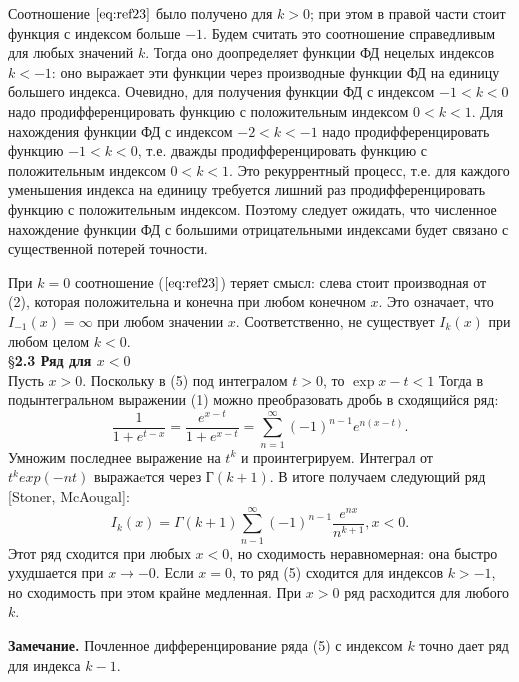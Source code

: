 Соотношение $\ref{eq:ref23}$ было получено для $k > 0$; при этом в правой части стоит
функция с индексом больше $-1$. Будем считать это соотношение справедливым
для любых значений $k$. Тогда оно доопределяет функции ФД нецелых индексов
$k < -1$: оно выражает эти функции через производные функции ФД на единицу
большего индекса. Очевидно, для получения функции ФД с индексом $-1 < k < 0$
надо продифференцировать функцию с положительным индексом $0 < k < 1$. Для
нахождения функции ФД с индексом $-2 < k < -1$ надо продифференцировать
функцию $-1< k < 0$, т.е. дважды продифференцировать функцию с
положительным индексом $0 < k < 1$. Это рекуррентный процесс, т.е. для
каждого уменьшения индекса на единицу требуется лишний раз
продифференцировать функцию с положительным индексом. Поэтому следует
ожидать, что численное нахождение функции ФД с большими отрицательными
индексами будет связано с существенной потерей точности.

При $k = 0$ соотношение ($\ref{eq:ref23}$) теряет смысл: слева стоит производная от (2),
которая положительна и конечна при любом конечном $x$. Это означает, что
$I_{-1}(x) = \infty$ при любом значении $x$. Соответственно, не существует $I_k(x)$ при
любом целом $k < 0$.
\\

\S \textbf{2.3 Ряд для $x < 0$}
\\

Пусть $x > 0$. Поскольку в (5) под интегралом $t > 0$, то $\exp{x-t} < 1$ Тогда в
подынтегральном выражении (1) можно преобразовать дробь в сходящийся
ряд:
\begin{equation}
\frac{1}{1+e^{t-x}} = \frac{e^{x-t}}{1+e^{x-t}}=\sum\limits_{n=1}^{\infty} (-1)^{n-1}e^{n(x-t)}.
\end{equation}
Умножим последнее выражение на $t^k$ и проинтегрируем. Интеграл от
$t^{k}exp(-nt)$ выражаeтся через $Г(k + 1)$. В итоге получаем следующий ряд [Stoner, McAougal]:
\begin{equation}
I_k(x)=\Gamma(k+1)\sum\limits_{n-1}^{\infty} (-1)^{n-1}\frac{e^{nx}}{n^{k+1}},x<0.
\end{equation}
Этот ряд сходится при любых $x < 0$, но сходимость неравномерная: она быстро
ухудшается при $x \to -0$. Если $x = 0$, то ряд (5) сходится для индексов $k > -1$, но
сходимость при этом крайне медленная. При $x > 0$ ряд расходится для любого
$k$.

\textbf{Замечание.} Почленное дифференцирование ряда (5) с индексом $k$ точно
дает ряд для индекса $k - 1$.
\\

